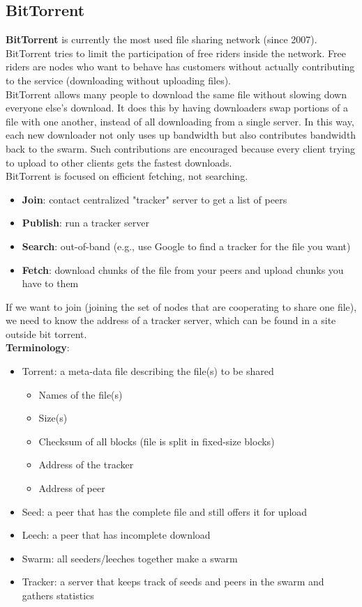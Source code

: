 \documentclass[10pt,a4paper]{article}
\begin{document}
\subsection{BitTorrent}
\textbf{BitTorrent} is currently the most used file sharing network (since 2007). \\
BitTorrent tries to limit the participation of free riders inside the network. Free riders are nodes who want to behave has customers without actually contributing to the service (downloading without uploading files). \\
BitTorrent allows many people to download the same file without slowing down everyone else's download. It does this by having downloaders swap portions of a file with one another, instead of all downloading from a single server. In this way, each new downloader not only uses up bandwidth but also contributes bandwidth back to the swarm. Such contributions are encouraged because every client trying to upload to other clients gets the fastest downloads. \\
BitTorrent is focused on efficient fetching, not searching.
\begin{itemize}
	\item \textbf{Join}: contact centralized "tracker" server to get a list of peers
	\item \textbf{Publish}: run a tracker server
	\item \textbf{Search}: out-of-band (e.g., use Google to find a tracker for the file you want)
	\item \textbf{Fetch}: download chunks of the file from your peers and upload chunks you have to them
\end{itemize}
If we want to join (joining the set of nodes that are cooperating to share one file), we need to know the address of a tracker server, which can be found in a site outside bit torrent. \\
\textbf{Terminology}:
\begin{itemize}
	\item Torrent: a meta-data file describing the file(s) to be shared
	\begin{itemize}
		\item Names of the file(s)
		\item Size(s)
		\item Checksum of all blocks (file is split in fixed-size blocks)
		\item Address of the tracker
		\item Address of peer
	\end{itemize}
	\item Seed: a peer that has the complete file and still offers it for upload
	\item Leech: a peer that has incomplete download
	\item Swarm: all seeders/leeches together make a swarm
	\item Tracker: a server that keeps track of seeds and peers in the swarm and gathers statistics
\end{itemize}
\end{document}
